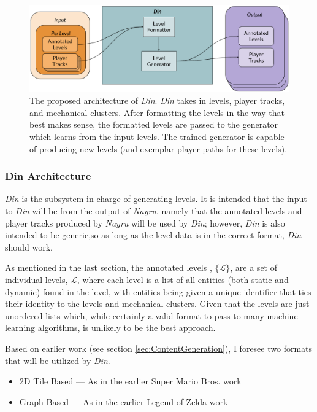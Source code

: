 \documentclass[a4paper]{article}
\begin{document}
\begin{figure}[h]
\centering
\includegraphics[width=1\textwidth]{figures/Din_Architecture.pdf}
\caption{The proposed architecture of \textit{Din}.  \textit{Din} takes in levels, player tracks, and mechanical clusters. After formatting the levels in the way that best makes sense, the formatted levels are passed to the generator which learns from the input levels.  The trained generator is capable of producing new levels (and exemplar player paths for these levels).  }
\label{fig:din_architecture}
\end{figure}

\subsubsection{Din Architecture}

\textit{Din} is the subsystem in charge of generating levels.  It is intended that the input to \textit{Din} will be from the output of \textit{Nayru}, namely that the annotated levels and player tracks produced by \textit{Nayru} will be used by \textit{Din}; however, \textit{Din} is also intended to be generic,so as long as the level data is in the correct format, \textit{Din} should work.

As mentioned in the last section, the annotated levels ,  $\{\mathcal{L}\}$, are a set of individual levels, $\mathcal{L}$, where each level is a list of all entities (both static and dynamic) found in the level, with entities being given a unique identifier that ties their identity to the levels and mechanical clusters.  Given that the levels are just unordered lists which, while certainly a valid format to pass to many machine learning algorithms, is unlikely to be the best approach.  

Based on earlier work (see section \ref{sec:ContentGeneration}), I foresee two formats that will be utilized by \textit{Din}.

\begin{itemize}
\item 2D Tile Based --- As in the earlier Super Mario Bros. work
\item Graph Based --- As in the earlier Legend of Zelda work
\end{itemize}
\end{document}

